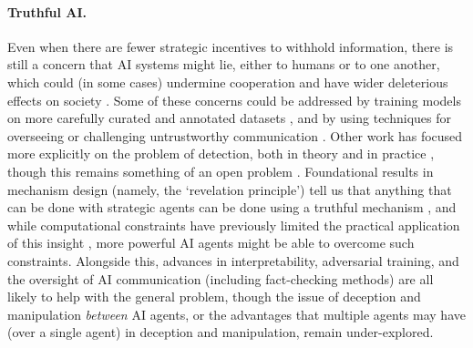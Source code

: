 \paragraph{Truthful AI.}
Even when there are fewer strategic incentives to withhold information, there is still a concern that AI systems might lie, either to humans or to one another, which could (in some cases) undermine cooperation and have wider deleterious effects on society \citep{Evans2021,Park2024}.
Some of these concerns could be addressed by training models on more carefully curated and annotated datasets \citep{Peskov2020,Aly2021}, and by using techniques for overseeing or challenging untrustworthy communication \citep{Irving2018,Greenblatt2023}.
Other work has focused more explicitly on the problem of detection, both in theory \citep{Ward2023} and in practice \citep{Pacchiardi2024,Azaria2023,Burns2022}, though this remains something of an open problem \citep{Levinstein2023}.
Foundational results in mechanism design (namely, the `revelation principle') tell us that anything that can be done with strategic agents can be done using a truthful mechanism \citep{Gibbard1973}, and while computational constraints have previously limited the practical application of this insight \citep{Conitzer2004a}, more powerful AI agents might be able to overcome such constraints.
Alongside this, advances in interpretability, adversarial training, and the oversight of AI communication (including fact-checking methods) are all likely to help with the general problem, though the issue of deception and manipulation \textit{between} AI agents, or the advantages that multiple agents may have (over a single agent) in deception and manipulation, remain under-explored.




